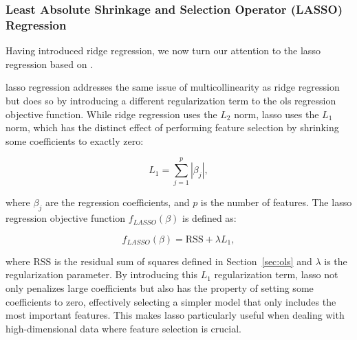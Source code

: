 \subsubsection{Least Absolute Shrinkage and Selection Operator (LASSO) Regression}
Having introduced ridge regression, we now turn our attention to the \gls{lasso} regression based on \citet{James2023AnIS}.

\gls{lasso} regression addresses the same issue of multicollinearity as ridge regression but does so by introducing a different regularization term to the \gls{ols} regression objective function.
While ridge regression uses the $L_2$ norm, \gls{lasso} uses the $L_1$ norm, which has the distinct effect of performing feature selection by shrinking some coefficients to exactly zero:

$$
L_1 = \sum_{j=1}^{p} |\beta_j|,
$$

where $\beta_j$ are the regression coefficients, and $p$ is the number of features.
The \gls{lasso} regression objective function $f_{LASSO}(\beta)$ is defined as:

$$
f_{LASSO}(\beta) = \text{RSS} + \lambda L_1,
$$

where $\text{RSS}$ is the residual sum of squares defined in Section~\ref{sec:ols} and $\lambda$ is the regularization parameter.
By introducing this $L_1$ regularization term, \gls{lasso} not only penalizes large coefficients but also has the property of setting some coefficients to zero, effectively selecting a simpler model that only includes the most important features.
This makes \gls{lasso} particularly useful when dealing with high-dimensional data where feature selection is crucial.